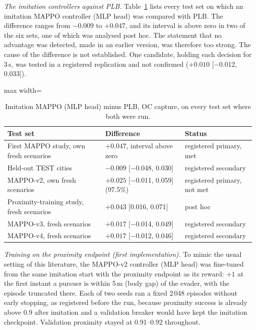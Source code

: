\documentclass[preprint,12pt]{elsarticle}
\begin{document}
\emph{The imitation controllers against PLB.} Table~\ref{tab:s-imitation} lists every test set on which an imitation
MAPPO controller (MLP head) was compared with PLB. The difference ranges from $-0.009$ to $+0.047$, and its interval
is above zero in two of the six sets, one of which was analysed post hoc. The statement that no advantage was
detected, made in an earlier version, was therefore too strong. The cause of the difference is not established. One
candidate, holding each decision for 3\,s, was tested in a registered replication and not confirmed ($+0.010$
[$-$0.012, 0.033]).

\begin{table}[!h]
\centering
\caption{Imitation MAPPO (MLP head) minus PLB, OC capture, on every test set where both were run.}
\label{tab:s-imitation}
\begin{adjustbox}{max width=\textwidth}
\begin{tabular}{@{}lll@{}}
\toprule
Test set & Difference & Status \\
\midrule
First MAPPO study, own fresh scenarios & $+0.047$, interval above zero & registered primary, met \\
Held-out TEST cities & $-0.009$ [$-$0.048, 0.030] & registered secondary \\
MAPPO-v2, own fresh scenarios & $+0.025$ [$-$0.011, 0.059] (97.5\%) & registered primary, not met \\
Proximity-training study, fresh scenarios & $+0.043$ [0.016, 0.071] & post hoc \\
MAPPO-v3, fresh scenarios & $+0.017$ [$-$0.014, 0.049] & registered secondary \\
MAPPO-v4, fresh scenarios & $+0.017$ [$-$0.012, 0.046] & registered secondary \\
\bottomrule
\end{tabular}
\end{adjustbox}
\end{table}

\emph{Training on the proximity endpoint (first implementation).} To mimic the usual setting of this literature, the MAPPO-v2 controller (MLP
head) was fine-tuned from the same imitation start with the proximity endpoint as its reward: $+1$ at the first
instant a pursuer is within 5\,m (body gap) of the evader, with the episode truncated there. Each of two seeds ran a
fixed 2\,048 episodes without early stopping, as registered before the run, because proximity success is already
above 0.9 after imitation and a validation breaker would have kept the imitation checkpoint. Validation proximity
stayed at 0.91--0.92 throughout.
\end{document}
